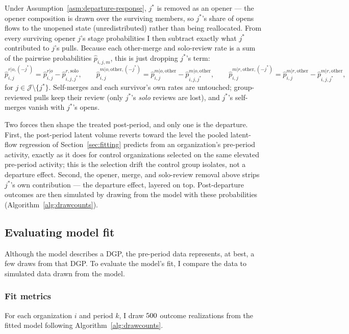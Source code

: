 \documentclass[12pt,notitlepage]{article}
\begin{document}
Under Assumption~\ref{asm:departure-response}, $j^*$ is removed as an opener --- the opener composition is drawn over the surviving members, so $j^*$'s share of opens flows to the unopened state (unredistributed) rather than being reallocated.
From every surviving opener $j$'s stage probabilities I then subtract exactly what $j^*$ contributed to $j$'s pulls.
Because each other-merge and solo-review rate is a sum of the pairwise probabilities $\hat p_{i,j,m}$, this is just dropping $j^*$'s term:
\[ \hat p_{i,j}^{r|o,(-j^*)} = \hat p_{i,j}^{r|o} - \hat p_{i,j,j^*}^{r,\mathrm{solo}}, \qquad \hat p_{i,j}^{m|o,\mathrm{other},(-j^*)} = \hat p_{i,j}^{m|o,\mathrm{other}} - \hat p_{i,j,j^*}^{m|o,\mathrm{other}}, \qquad \hat p_{i,j}^{m|r,\mathrm{other},(-j^*)} = \hat p_{i,j}^{m|r,\mathrm{other}} - \hat p_{i,j,j^*}^{m|r,\mathrm{other}}, \]
for $j\in\mathcal J\setminus\{j^*\}$.
Self-merges and each survivor's own rates are untouched; group-reviewed pulls keep their review (only $j^*$'s \emph{solo} reviews are lost), and $j^*$'s self-merges vanish with $j^*$'s opens.

Two forces then shape the treated post-period, and only one is the departure.
First, the post-period latent volume reverts toward the level the pooled latent-flow regression of Section~\ref{sec:fitting} predicts from an organization's pre-period activity, exactly as it does for control organizations selected on the same elevated pre-period activity; this is the selection drift the control group isolates, not a departure effect.
Second, the opener, merge, and solo-review removal above strips $j^*$'s own contribution --- the departure effect, layered on top.
Post-departure outcomes are then simulated by drawing from the model with these probabilities (Algorithm~\ref{alg:drawcounts}).
\subsection{Evaluating model fit}

Although the model describes a DGP, the pre-period data represents, at best, a few draws from that DGP.
To evaluate the model's fit, I compare the data to simulated data drawn from the model.

\subsubsection{Fit metrics}\label{sec:metric}

For each organization $i$ and period $k$, I draw $500$ outcome realizations from the fitted model following Algorithm~\ref{alg:drawcounts}.
\end{document}
